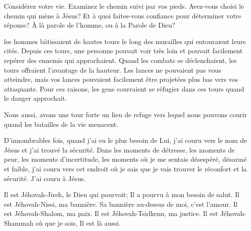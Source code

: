 Considérez votre vie. Examinez le chemin suivi par vos pieds.
 Avez-vous choisi le chemin qui mène à Jésus?
 Et à quoi faites-vous confiance pour déterminer votre réponse?
 À là parole de l'homme, ou à la Parole de Dieu?

\dvrule







 les hommes bâtissaient de hautes tours
 le long des murailles qui entouraient leurs cités.
 Depuis ces tours, une personne pouvait voir très loin et pouvait facilement
 repérer des ennemis qui approchaient.
 Quand les combats se déclenchaient, les tours offraient
 l'avantage de la hauteur. Les lances ne pouvaient pas vous atteindre,
 mais vos lances pouvaient facilement être projetées plus bas
 vers vos attaquants.
 Pour ces raisons, les gens courraient se réfugier dans ces tours
 quand le danger approchait. 

Nous aussi, avons une tour forte \ocadr un lieu de refuge vers lequel
 nous pouvons courir quand les batailles de la vie menacent. 


D'innombrables fois, quand j'ai eu le plus besoin de Lui,
 j'ai couru vers le nom de Jésus et j'ai trouvé la sécurité.
 Dans les moments de détresse, les moments de peur,
 les moments d'incertitude, les moments où je me sentais désespéré,
 désarmé et faible, j'ai couru vers cet endroit où je sais
 que je vais trouver le réconfort et la sécurité. J'ai couru à Jésus. 

Il est Jéhovah-Jireh, le Dieu qui pourvoit; Il 
 a pourvu à mon besoin de salut. Il est Jéhovah-Nissi, ma bannière.
 Sa bannière au-dessus de moi, c'est l'amour. Il est Jéhovah-Shalom, 
 ma paix. Il est Jéhovah-Tsidkenu, ma justice. Il est Jéhovah-Shammah 
 \ocadr où que je sois, Il est là aussi. 

